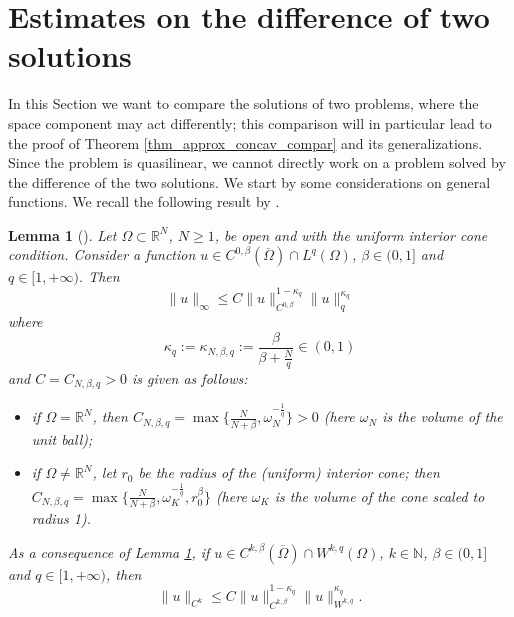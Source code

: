 \documentclass[11pt, reqno]{amsart}
\newtheorem{lemma}{Lemma}[section]
\theoremstyle{definition}
\numberwithin{equation}{section}
\newcommand{\R}{\mathbb{R}}
\newcommand{\N}{\mathbb{N}}
\def\norm#1{\|#1\|}
\begin{document}
\section{Estimates on the difference of two solutions}
\label{sec_diff_solutions}

In this Section we want to compare the solutions of two problems, where the space component may act differently; this comparison will in particular lead to the proof of Theorem \ref{thm_approx_concav_compar} and its generalizations. 
Since the problem is quasilinear, we cannot directly work on a problem solved by the difference of the two solutions.
We start by some considerations on general functions. 
We recall the following result by \cite[Theorems 1.1 and 1.2]{Le007}.
\begin{lemma}[\cite{Le007}]
\label{lem_estim_mixed}
Let $\Omega \subset \R^N$, $N \geq 1$, be open and with the uniform interior cone condition. Consider a function $u \in C^{0,\beta}(\overline{\Omega}) \cap L^q(\Omega)$, $\beta \in (0,1]$ and $q \in [1,+\infty)$. 
Then 
\begin{equation}\label{eq_diff_soluz_origin}
\norm{u}_{\infty} \leq C \norm{u}_{C^{0,\beta}}^{1-\kappa_q} \norm{u}_q^{\kappa_q}
\end{equation}
where $$\kappa_q:=\kappa_{N,\beta,q}:=\frac{\beta}{\beta + \frac{N}{q}} \in (0,1)$$
and $C=C_{N,\beta,q}>0$ is given as follows:
\begin{itemize}
\item if $\Omega = \R^N$, then $C_{N,\beta,q}=\max\{\frac{N}{N+\beta}, \omega_N^{-\frac{1}{q}}\}>0$ (here $\omega_N$ is the volume of the unit ball);
\item if $\Omega \neq \R^N$, let $r_0$ be the radius of the (uniform) interior cone; then $C_{N,\beta,q} = \max\big\{\frac{N}{N+\beta}, \omega_K^{-\frac{1}{q}}, r_0^{\beta}\big\}$ (here $\omega_K$ is the volume of the cone scaled to radius 1).
\end{itemize}
As a consequence of Lemma \ref{lem_estim_mixed}, if $u \in C^{k,\beta}(\overline{\Omega}) \cap W^{k,q}(\Omega)$, $k \in \N$, $\beta \in (0,1]$ and $q \in [1,+\infty)$, then
$$\norm{u}_{C^{k}} \leq C \norm{u}_{C^{k,\beta}}^{1-\kappa_q} \norm{u}_{W^{k,q}}^{\kappa_q}.$$
\end{lemma}
\end{document}
